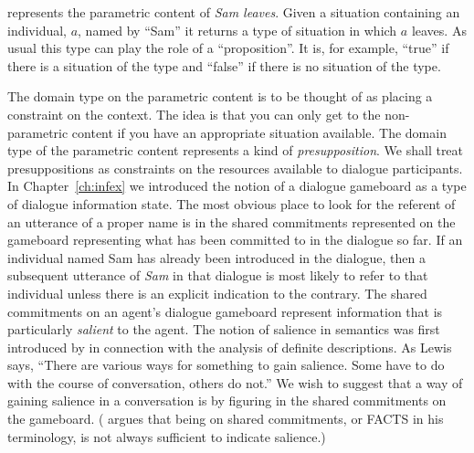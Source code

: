 \preveg{} represents the parametric content of \textit{Sam leaves}.
Given a situation containing an individual, $a$, named by ``Sam'' it
returns a type of situation in which $a$ leaves.  As usual this type
can play the role of a ``proposition''.  It  is, for example, ``true''
if there is a situation of the type and ``false'' if there is no
situation of the type.  

The domain type on the parametric content
is to be thought of as placing a constraint on the context.  The idea
is that you can only get to the non-parametric content if you have an
appropriate situation available.  The domain type of the parametric
content represents a kind of \textit{presupposition}.  We shall treat
presuppositions as constraints on the resources available to dialogue
participants.  In Chapter~\ref{ch:infex} we introduced the notion of a
dialogue gameboard as a type of dialogue information state.  The most
obvious place to look for the referent of an utterance of a proper
name is in the shared commitments represented on the gameboard
representing what has been committed to in the dialogue so far.  If an
individual named Sam has already been introduced in the dialogue, then
a subsequent utterance of \textit{Sam} in that dialogue is most likely
to refer to that individual unless there is an explicit indication to
the contrary.  The shared commitments on an agent's dialogue gameboard
represent information that is particularly \textit{salient} to the
agent.  The notion of salience in semantics was first introduced by
\cite{Lewis1979} in connection with the analysis of definite
descriptions.  As Lewis says, ``There are various ways for something
to gain salience. Some have to do with the course of conversation,
others do not.''  We wish to suggest that a way of gaining salience in
a conversation is by figuring in the shared commitments on the
gameboard.  (\cite{Ginzburg2012} argues that being on shared
commitments, or FACTS in his terminology, is not always sufficient to
indicate salience.)

